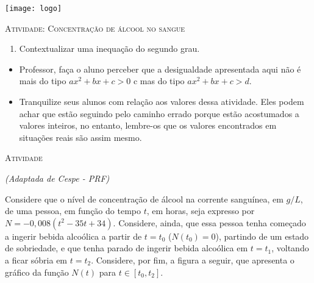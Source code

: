\documentclass[10 pt,usenames,dvipsnames, oneside]{article}
\begin{document}
\begin{center}
  \begin{minipage}[l]{3cm}
\texttt{[image: logo]}    
\end{minipage}\hfill
\begin{minipage}[r]{.8\textwidth}
 {\Large \scshape Atividade: Concentração de álcool no sangue}  
\end{minipage}
\end{center}
\vspace{.2cm}

\ifdefined\prof

\begin{goals}
\begin{enumerate}
\item Contextualizar uma inequação do segundo grau.
\end{enumerate}

\tcblower

\begin{itemize}
\item Professor, faça o aluno perceber que a desigualdade apresentada aqui não é mais do tipo $ax^2+bx+c>0$ c mas do tipo $ax^2+bx+c>d$.
\item Tranquilize seus alunos com relação aos valores dessa atividade. Eles podem achar que estão seguindo pelo caminho errado porque estão acostumados a valores inteiros, no entanto, lembre-os que os valores encontrados em situações reais são assim mesmo.  
\end{itemize}
\end{goals}

\bigskip
\begin{center}
{\large \scshape Atividade}
\end{center}
\fi
\textit{(Adaptada de Cespe - PRF)}

Considere que o nível de concentração de álcool na corrente sanguínea, em $g/L$, de uma pessoa, em função do tempo $t$, em horas, seja expresso por $N =-0{,}008(t^2 - 35t + 34)$. Considere, ainda, que essa pessoa tenha começado a ingerir bebida alcoólica a partir de $t = t_0$ ($N(t_0) = 0$), partindo de um estado de sobriedade, e que tenha parado de ingerir bebida alcoólica em $t = t_1$, voltando a ficar sóbria em $t = t_2$. Considere, por fim, a figura a seguir, que apresenta o gráfico da função $N(t)$ para $t \in [t_0, t_2]$. 
\end{document}
